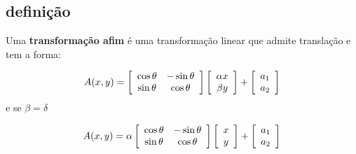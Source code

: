 \subsection{definição}

\begin{definition}

Uma \textbf{transformação afim} é uma transformação linear que admite translação e tem a forma:

\end{definition}

\begin{equation}
    A(x, y) = 
    \left[ 
    {
        \begin{array}{c c}
            \cos{\theta} & -\sin{\theta} \\
            \sin{\theta} &  \cos{\theta} \\
        \end{array} 
    } 
    \right]
    \left[ 
    {
        \begin{array}{c}
            \alpha  x \\
            \beta   y \\
        \end{array} 
        } 
    \right]
    +
    \left[ 
    {
        \begin{array}{c}
            a_1 \\ 
            a_2 \\
        \end{array} 
    } 
    \right]
\end{equation}
e se \( \beta = \delta\)

\begin{equation}
    A(x, y) =
    \alpha
    \left[ 
    {
        \begin{array}{c c}
            \cos{\theta} & -\sin{\theta} \\
            \sin{\theta} &  \cos{\theta} \\
        \end{array} 
    } 
    \right]
    \left[ 
    {
        \begin{array}{c}
            x \\
            y \\
        \end{array} 
        } 
    \right]
    +
    \left[ 
    {
        \begin{array}{c}
            a_1 \\ 
            a_2 \\
        \end{array} 
    } 
    \right]
\end{equation}

